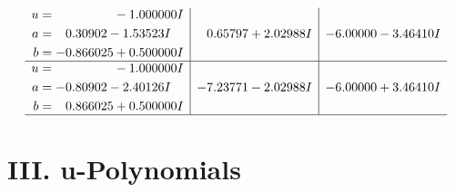 \documentclass[1p]{elsarticle_modified}
\theoremstyle{definition}
\begin{document}
$$\begin{array}{c|c|c}
\begin{aligned}
u &= \phantom{-0.000000 } -1.000000 I \\
a &= \phantom{-}0.30902 - 1.53523 I \\
b &= -0.866025 + 0.500000 I\end{aligned}
 & \phantom{-}0.65797 + 2.02988 I & -6.00000 - 3.46410 I \\ \hline\begin{aligned}
u &= \phantom{-0.000000 } -1.000000 I \\
a &= -0.80902 - 2.40126 I \\
b &= \phantom{-}0.866025 + 0.500000 I\end{aligned}
 & -7.23771 - 2.02988 I & -6.00000 + 3.46410 I\\
 \hline 
 \end{array}$$\newpage
\newpage\renewcommand{\arraystretch}{1}
\centering \section*{ III. u-Polynomials}
\end{document}
